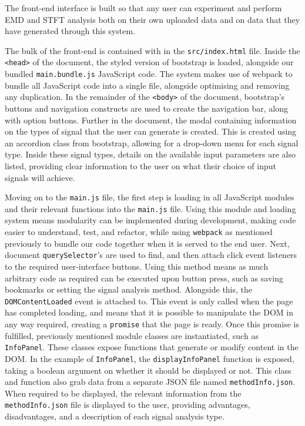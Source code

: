 The front-end interface is built so that any user can experiment and perform EMD and STFT analysis both on their own uploaded data and on data that they have generated through this system.

The bulk of the front-end is contained with in the \verb|src/index.html| file. Inside the \verb|<head>| of the document, the styled version of bootstrap is loaded, alongside our bundled \verb|main.bundle.js| 
JavaScript code. The system makes use of webpack to bundle all JavaScript code into a single file, alongside optimising and removing any duplication. In the remainder of the \verb|<body>| of the document, 
bootstrap's buttons and navigation constructs are used to create the navigation bar, along with option buttons. Further in the document, the modal containing information on the types of signal that 
the user can generate is created. This is created using an accordion class from bootstrap, allowing for a drop-down menu for each signal type. Inside these signal types, details on the available
input parameters are also listed, providing clear information to the user on what their choice of input signals will achieve. 

Moving on to the \verb|main.js| file, the first step is loading in all JavaScript modules and their relevant functions into the \verb|main.js| file. Using this module and loading system means modularity can
be implemented during development, making code easier to understand, test, and refactor, while using \verb|webpack| as mentioned previously to bundle our code together when it is served to the end user.
Next, document \verb|querySelector|'s are used to find, and then attach click event listeners to the required user-interface buttons. Using this method means as much arbitrary code as required can be
executed upon button press, such as saving bookmarks or setting the signal analysis method.
Alongside this, the \verb|DOMContentLoaded| event is attached to. This event is only called when the page has completed loading, and means that it is possible to manipulate the DOM in any way required,
creating a \verb|promise| that the page is ready.
Once this promise is fulfilled, previously mentioned module classes are instantiated, such as \verb|InfoPanel|. These classes expose functions that generate or modify content in the DOM. In the example 
of \verb|InfoPanel|, the \verb|displayInfoPanel| function is exposed, taking a boolean argument on whether it should be displayed or not. This class and function also grab data from a separate JSON
file named \verb|methodInfo.json|. When required to be displayed, the relevant information from the \verb|methodInfo.json| file is displayed to the user, providing advantages, disadvantages, and a description
of each signal analysis type.

